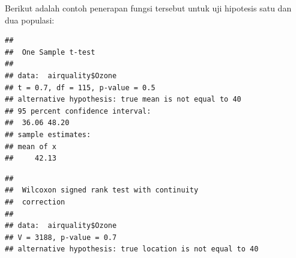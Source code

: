 \documentclass[
]{book}
\newenvironment{Shaded}{\begin{snugshade}}{\end{snugshade}}
\newcommand{\AttributeTok}[1]{\textcolor[rgb]{0.13,0.29,0.53}{#1}}
\newcommand{\CommentTok}[1]{\textcolor[rgb]{0.56,0.35,0.01}{\textit{#1}}}
\newcommand{\DecValTok}[1]{\textcolor[rgb]{0.00,0.00,0.81}{#1}}
\newcommand{\FunctionTok}[1]{\textcolor[rgb]{0.13,0.29,0.53}{\textbf{#1}}}
\newcommand{\NormalTok}[1]{#1}
\newcommand{\SpecialCharTok}[1]{\textcolor[rgb]{0.81,0.36,0.00}{\textbf{#1}}}
\newcommand{\StringTok}[1]{\textcolor[rgb]{0.31,0.60,0.02}{#1}}
\theoremstyle{definition}
\theoremstyle{definition}
\theoremstyle{definition}
\theoremstyle{definition}
\theoremstyle{remark}
\begin{document}
Berikut adalah contoh penerapan fungsi tersebut untuk uji hipotesis satu dan dua populasi:

\begin{Shaded}
\end{Shaded}

\begin{verbatim}
## 
##  One Sample t-test
## 
## data:  airquality$Ozone
## t = 0.7, df = 115, p-value = 0.5
## alternative hypothesis: true mean is not equal to 40
## 95 percent confidence interval:
##  36.06 48.20
## sample estimates:
## mean of x 
##     42.13
\end{verbatim}

\begin{Shaded}
\end{Shaded}

\begin{verbatim}
## 
##  Wilcoxon signed rank test with continuity
##  correction
## 
## data:  airquality$Ozone
## V = 3188, p-value = 0.7
## alternative hypothesis: true location is not equal to 40
\end{verbatim}
\end{document}
